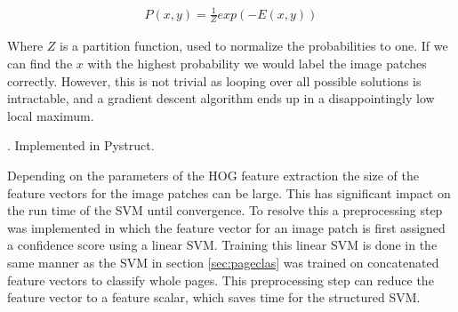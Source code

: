 \begin{align}
P(x, y) = \frac{1}{Z} exp(-E(x, y))
\end{align}

Where $Z$ is a partition function, used to normalize the probabilities to one.
If we can find the $x$ with the highest probability we would label
the image patches correctly. However, this is not trivial as
looping over all possible solutions is intractable, and a gradient descent
algorithm ends up in a disappointingly low local maximum\cite{bishop2006pattern}.

 \cite{joachims2009cutting}. Implemented in
Pystruct\cite{muller2013pystruct}.

Depending on the parameters of the HOG feature extraction the size of the
feature vectors for the image patches can be large. This has significant impact
on the run time of the SVM until convergence. To resolve this a preprocessing
step was implemented in which the feature vector for an image patch is first
assigned a confidence score using a linear SVM. Training this linear SVM is done
in the same manner as the SVM in section \ref{sec:pageclas} was trained on
concatenated feature vectors to classify whole pages. This preprocessing step
can reduce the feature vector to a feature scalar, which saves time for the
structured SVM.


